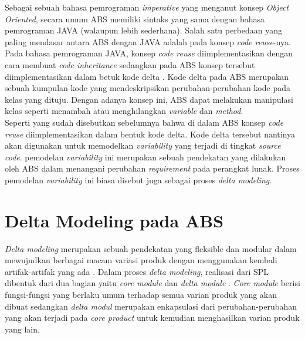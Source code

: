 Sebagai sebuah bahasa pemrograman \textit{imperative} yang menganut konsep \textit{Object Oriented}, secara umum ABS memiliki sintaks yang sama dengan bahasa pemrograman JAVA (walaupun lebih sederhana). Salah satu perbedaan yang paling mendasar antara ABS dengan JAVA adalah pada konsep \textit{code reuse}-nya. Pada bahasa pemrograman JAVA, konsep \textit{code reuse} diimplementasikan dengan cara membuat \textit{code inheritance} sedangkan pada ABS konsep tersebut diimplementasikan dalam betuk kode delta \citep{hahnle2013hats}. Kode delta pada ABS merupakan sebuah kumpulan kode yang mendeskripsikan perubahan-perubahan kode pada kelas yang dituju. Dengan adanya konsep ini, ABS dapat melakukan manipulasi kelas seperti menambah atau menghilangkan \textit{variable} dan \textit{method}. \\

Seperti yang sudah disebutkan sebelumnya bahwa di dalam ABS konsep \textit{code reuse} diimplementasikan dalam bentuk kode delta. Kode delta tersebut nantinya akan digunakan untuk memodelkan \textit{variability} yang terjadi di tingkat \textit{source code}. pemodelan \textit{variability} ini merupakan sebuah pendekatan yang dilakukan oleh ABS dalam menangani perubahan \textit{requirement} pada perangkat lunak. Proses pemodelan \textit{variability} ini biasa disebut juga sebagai proses \textit{delta modeling}. \\

\section{Delta Modeling pada ABS}

\textit{Delta modeling} merupakan sebuah pendekatan yang fleksible dan modular dalam mewujudkan berbagai macam variasi produk dengan menggunakan kembali artifak-artifak yang ada \citep{hahnle2013hats}. Dalam proses \textit{delta modeling}, realisasi dari SPL dibentuk dari dua bagian yaitu \textit{core module} dan \textit{delta module} \cite{haber2011delta}. \textit{Core module} berisi fungsi-fungsi yang berlaku umum terhadap semua varian produk yang akan dibuat sedangkan \textit{delta modul} merupakan enkapsulasi dari perubahan-perubahan yang akan terjadi pada \textit{core product} untuk kemudian menghasilkan varian produk yang lain.\\


